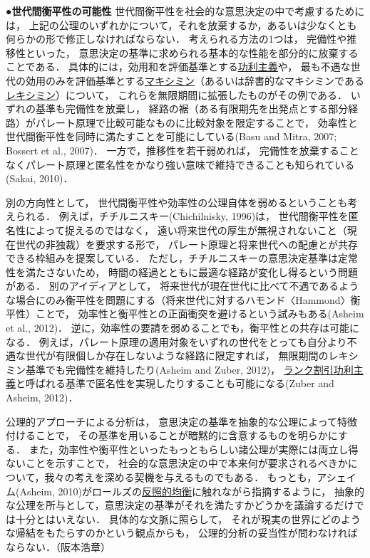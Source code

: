\documentclass[11pt,a4paper]{article}
\begin{document}
\noindent\textbf{●世代間衡平性の可能性}\hspace{0.5em}
世代間衡平性を社会的な意思決定の中で考慮するためには，
上記の公理のいずれかについて，それを放棄するか，あるいは少なくとも何らかの形で修正しなければならない．
考えられる方法の1つは，
完備性や推移性といった，
意思決定の基準に求められる基本的な性能を部分的に放棄することである．
具体的には，効用和を評価基準とする\underline{功利主義}や，
最も不遇な世代の効用のみを評価基準とする\underline{マキシミン}（あるいは辞書的なマキシミンである\underline{レキシミン}）について，%
これらを無限期間に拡張したものがその例である．
いずれの基準も完備性を放棄し，
経路の裾（ある有限期先を出発点とする部分経路）がパレート原理で比較可能なものに比較対象を限定することで，
効率性と世代間衡平性を同時に満たすことを可能にしている(Basu and Mitra, 2007; Bossert et al., 2007)．
一方で，推移性を若干弱めれば，
完備性を放棄することなくパレート原理と匿名性をかなり強い意味で維持できることも知られている(Sakai, 2010)．

別の方向性として，
世代間衡平性や効率性の公理自体を弱めるということも考えられる．
例えば，チチルニスキー(Chichilnisky, 1996)は，
世代間衡平性を匿名性によって捉えるのではなく，
遠い将来世代の厚生が無視されないこと（現在世代の非独裁）を要求する形で，
パレート原理と将来世代への配慮とが共存できる枠組みを提案している．
ただし，チチルニスキーの意思決定基準は定常性を満たさないため，
時間の経過とともに最適な経路が変化し得るという問題がある．
別のアイディアとして，
将来世代が現在世代に比べて不遇であるような場合にのみ衡平性を問題にする（将来世代に対するハモンド〈Hammond〉衡平性）ことで，
効率性と衡平性との正面衝突を避けるという試みもある(Asheim et al., 2012)．
逆に，効率性の要請を弱めることでも，衡平性との共存は可能になる．
例えば，パレート原理の適用対象をいずれの世代をとっても自分より不遇な世代が有限個しか存在しないような経路に限定すれば，
無限期間のレキシミン基準でも完備性を維持したり(Asheim and Zuber, 2012)，
\underline{ランク割引功利主義}と呼ばれる基準で匿名性を実現したりすることも可能になる(Zuber and Asheim, 2012)．

公理的アプローチによる分析は，
意思決定の基準を抽象的な公理によって特徴付けることで，
その基準を用いることが暗黙的に含意するものを明らかにする．
また，効率性や衡平性といったもっともらしい諸公理が実際には両立し得ないことを示すことで，
社会的な意思決定の中で本来何が要求されるべきかについて，我々の考えを深める契機を与えるものでもある．
もっとも，アシェイム(Asheim, 2010)がロールズの\underline{反照的均衡}に触れながら指摘するように，
抽象的な公理を所与として，意思決定の基準がそれを満たすかどうかを議論するだけでは十分とはいえない．
具体的な文脈に照らして，
それが現実の世界にどのような帰結をもたらすのかという観点からも，
公理的分析の妥当性が問わなければならない．（阪本浩章）
\end{document}
